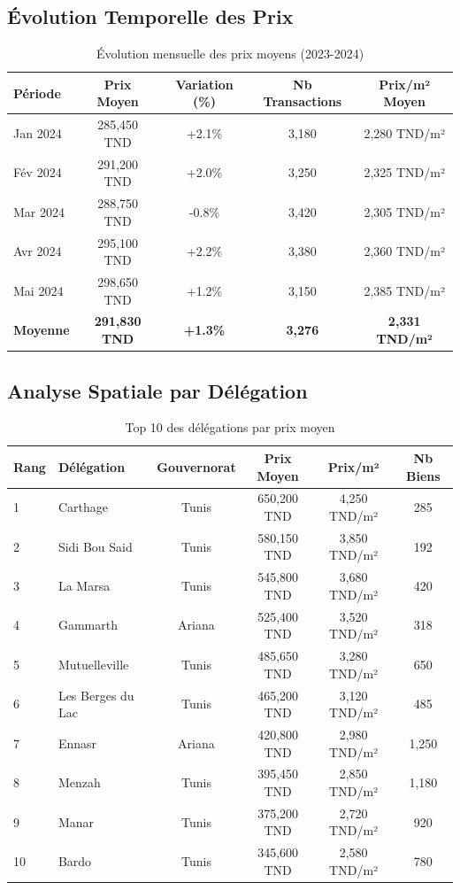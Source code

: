 \subsection{Évolution Temporelle des Prix}

\begin{table}[H]
\centering
\caption{Évolution mensuelle des prix moyens (2023-2024)}
\begin{tabular}{|l|c|c|c|c|}
\hline
\textbf{Période} & \textbf{Prix Moyen} & \textbf{Variation (\%)} & \textbf{Nb Transactions} & \textbf{Prix/m² Moyen} \\
\hline
Jan 2024 & 285,450 TND & +2.1\% & 3,180 & 2,280 TND/m² \\
Fév 2024 & 291,200 TND & +2.0\% & 3,250 & 2,325 TND/m² \\
Mar 2024 & 288,750 TND & -0.8\% & 3,420 & 2,305 TND/m² \\
Avr 2024 & 295,100 TND & +2.2\% & 3,380 & 2,360 TND/m² \\
Mai 2024 & 298,650 TND & +1.2\% & 3,150 & 2,385 TND/m² \\
\hline
\textbf{Moyenne} & \textbf{291,830 TND} & \textbf{+1.3\%} & \textbf{3,276} & \textbf{2,331 TND/m²} \\
\hline
\end{tabular}
\end{table}

\subsection{Analyse Spatiale par Délégation}

\begin{table}[H]
\centering
\caption{Top 10 des délégations par prix moyen}
\begin{tabular}{|l|l|c|c|c|c|}
\hline
\textbf{Rang} & \textbf{Délégation} & \textbf{Gouvernorat} & \textbf{Prix Moyen} & \textbf{Prix/m²} & \textbf{Nb Biens} \\
\hline
1 & Carthage & Tunis & 650,200 TND & 4,250 TND/m² & 285 \\
2 & Sidi Bou Said & Tunis & 580,150 TND & 3,850 TND/m² & 192 \\
3 & La Marsa & Tunis & 545,800 TND & 3,680 TND/m² & 420 \\
4 & Gammarth & Ariana & 525,400 TND & 3,520 TND/m² & 318 \\
5 & Mutuelleville & Tunis & 485,650 TND & 3,280 TND/m² & 650 \\
6 & Les Berges du Lac & Tunis & 465,200 TND & 3,120 TND/m² & 485 \\
7 & Ennasr & Ariana & 420,800 TND & 2,980 TND/m² & 1,250 \\
8 & Menzah & Tunis & 395,450 TND & 2,850 TND/m² & 1,180 \\
9 & Manar & Tunis & 375,200 TND & 2,720 TND/m² & 920 \\
10 & Bardo & Tunis & 345,600 TND & 2,580 TND/m² & 780 \\
\hline
\end{tabular}
\end{table}


